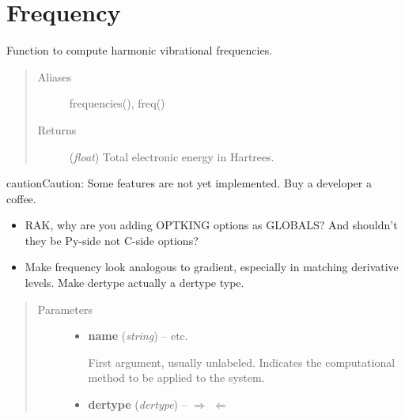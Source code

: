 \documentclass[letterpaper,10pt,english]{sphinxmanual}
\begin{document}
\chapter{Frequency}
\label{index:frequency}

\begin{fulllineitems}
\label{index:driver.frequency}
Function to compute harmonic vibrational frequencies.
\begin{quote}\begin{description}
\item[{Aliases }] \leavevmode
frequencies(), freq()

\item[{Returns}] \leavevmode
(\emph{float}) Total electronic energy in Hartrees.

\end{description}\end{quote}

\begin{notice}{caution}{Caution:}
Some features are not yet implemented. Buy a developer a coffee.
\begin{itemize}
\item {} 
RAK, why are you adding OPTKING options as GLOBALS? And shouldn't they be Py-side not C-side options?

\item {} 
Make frequency look analogous to gradient, especially in matching derivative levels. Make dertype actually a dertype type.

\end{itemize}
\end{notice}
\begin{quote}\begin{description}
\item[{Parameters}] \leavevmode\begin{itemize}
\item {} 
\textbf{name} (\emph{string}) -- 
 \textbar{}\textbar{}  \textbar{}\textbar{}  \textbar{}\textbar{} etc.

First argument, usually unlabeled. Indicates the computational method
to be applied to the system.


\item {} 
\textbf{dertype} (\emph{dertype}) -- 
$\Rightarrow$  $\Leftarrow$ \textbar{}\textbar{}  \textbar{}\textbar{} 


\end{itemize}
\end{description}
\end{quote}
\end{fulllineitems}
\end{document}
